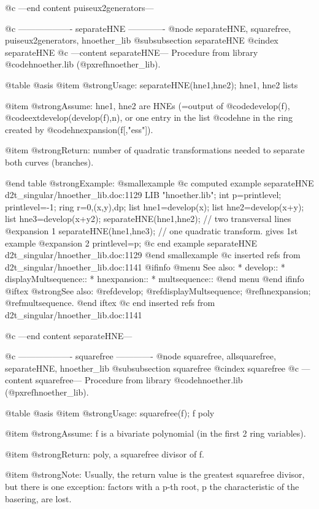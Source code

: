 @c ---end content puiseux2generators---

@c ------------------- separateHNE -------------
@node separateHNE, squarefree, puiseux2generators, hnoether_lib
@subsubsection separateHNE
@cindex separateHNE
@c ---content separateHNE---
Procedure from library @code{hnoether.lib} (@pxref{hnoether_lib}).

@table @asis
@item @strong{Usage:}
separateHNE(hne1,hne2); hne1, hne2 lists

@item @strong{Assume:}
hne1, hne2 are HNEs (=output of
@code{develop(f)}, @code{extdevelop(develop(f),n)}, or
one entry in the list @code{hne} in the ring created by
@code{hnexpansion(f[,"ess"])}.

@item @strong{Return:}
number of quadratic transformations needed to separate both curves
(branches).

@end table
@strong{Example:}
@smallexample
@c computed example separateHNE d2t_singular/hnoether_lib.doc:1129 
LIB "hnoether.lib";
int p=printlevel; printlevel=-1;
ring r=0,(x,y),dp;
list hne1=develop(x);
list hne2=develop(x+y);
list hne3=develop(x+y2);
separateHNE(hne1,hne2);  // two transversal lines
@expansion{} 1
separateHNE(hne1,hne3);  // one quadratic transform. gives 1st example
@expansion{} 2
printlevel=p;
@c end example separateHNE d2t_singular/hnoether_lib.doc:1129
@end smallexample
@c inserted refs from d2t_singular/hnoether_lib.doc:1141
@ifinfo
@menu
See also:
* develop::
* displayMultsequence::
* hnexpansion::
* multsequence::
@end menu
@end ifinfo
@iftex
@strong{See also:}
@ref{develop};
@ref{displayMultsequence};
@ref{hnexpansion};
@ref{multsequence}.
@end iftex
@c end inserted refs from d2t_singular/hnoether_lib.doc:1141

@c ---end content separateHNE---

@c ------------------- squarefree -------------
@node squarefree, allsquarefree, separateHNE, hnoether_lib
@subsubsection squarefree
@cindex squarefree
@c ---content squarefree---
Procedure from library @code{hnoether.lib} (@pxref{hnoether_lib}).

@table @asis
@item @strong{Usage:}
squarefree(f); f poly

@item @strong{Assume:}
f is a bivariate polynomial (in the first 2 ring variables).

@item @strong{Return:}
poly, a squarefree divisor of f.

@item @strong{Note:}
Usually, the return value is the greatest squarefree divisor, but
there is one exception: factors with a p-th root, p the
characteristic of the basering, are lost.

